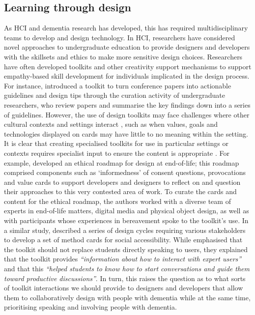 \subsection{Learning through design}
\label{Dementia-Design}
As HCI and dementia research has developed, this has required multidisciplinary teams to develop and design technology. In HCI, researchers have considered novel approaches to undergraduate education to provide designers and developers with the skillsets and ethics to make more sensitive design choices. Researchers have often developed toolkits and other creativity support mechanisms to support empathy-based skill development for individuals implicated in the design process. For instance, \cite{chen2020interaction} introduced a toolkit to turn conference papers into actionable guidelines and design tips through the curation activity of undergraduate researchers, who review papers and summarise the key findings down into a series of guidelines. However, the use of design toolkits may face challenges where other cultural contexts and settings interact \citep{peters2020toolkits}, such as when values, goals and technologies displayed on cards may have little to no meaning within the setting.   
It is clear that creating specialised toolkits for use in particular settings or contexts requires specialist input to ensure the content is appropriate \citep{alshehri2020scenario,meissner2018schnittmuster}. For example, \cite{craig2021development} developed an ethical roadmap for design at end-of-life; this roadmap comprised components such as `informedness’ of consent questions, provocations and value cards to support developers and designers to reflect on and question their approaches to this very contested area of work. To curate the cards and content for the ethical roadmap, the authors worked with a diverse team of experts in end-of-life matters, digital media and physical object design, as well as with participants whose experiences in bereavement spoke to the toolkit’s use. In a similar study, \cite{shinohara2020design} described a series of design cycles requiring various stakeholders to develop a set of method cards for social accessibility. While \cite{shinohara2020design} emphasised that the toolkit should not replace students directly speaking to users, they explained that the toolkit provides \textit{``information about how to interact with expert users''} and that this \textit{``helped students to know how to start conversations and guide them toward productive discussions''}. In turn, this raises the question as to what sorts of toolkit interactions we should provide to designers and developers that allow them to collaboratively design with people with dementia while at the same time, prioritising speaking and involving people with dementia.

